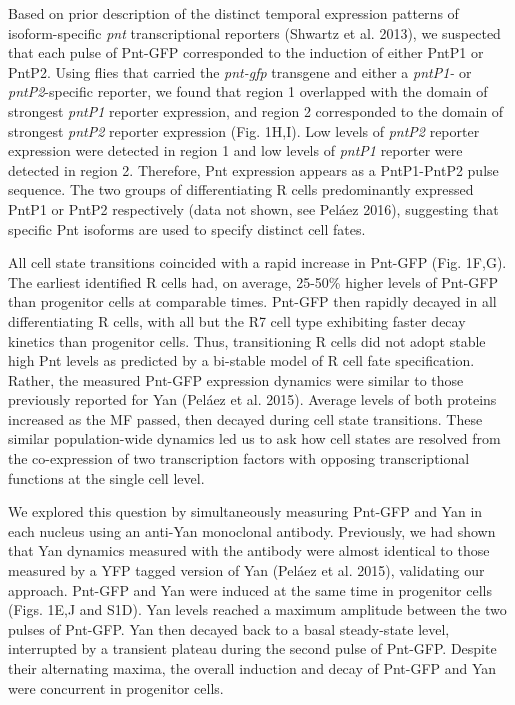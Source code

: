 Based on prior description of the distinct temporal expression patterns of isoform-specific \emph{pnt} transcriptional reporters (Shwartz et al. 2013), we suspected that each pulse of Pnt-GFP corresponded to the induction of either PntP1 or PntP2. Using flies that carried the \emph{pnt-gfp} transgene and either a \emph{pntP1-} or \emph{pntP2}-specific reporter, we found that region 1 overlapped with the domain of strongest \emph{pntP1} reporter expression, and region 2 corresponded to the domain of strongest \emph{pntP2} reporter expression (Fig. 1H,I). Low levels of \emph{pntP2} reporter expression were detected in region 1 and low levels of \emph{pntP1} reporter were detected in region 2. Therefore, Pnt expression appears as a PntP1-PntP2 pulse sequence. The two groups of differentiating R cells predominantly expressed PntP1 or PntP2 respectively (data not shown, see Peláez 2016), suggesting that specific Pnt isoforms are used to specify distinct cell fates.

All cell state transitions coincided with a rapid increase in Pnt-GFP (Fig. 1F,G). The earliest identified R cells had, on average, 25-50\% higher levels of Pnt-GFP than progenitor cells at comparable times. Pnt-GFP then rapidly decayed in all differentiating R cells, with all but the R7 cell type exhibiting faster decay kinetics than progenitor cells. Thus, transitioning R cells did not adopt stable high Pnt levels as predicted by a bi-stable model of R cell fate specification. Rather, the measured Pnt-GFP expression dynamics were similar to those previously reported for Yan (Peláez et al. 2015). Average levels of both proteins increased as the MF passed, then decayed during cell state transitions. These similar population-wide dynamics led us to ask how cell states are resolved from the co-expression of two transcription factors with opposing transcriptional functions at the single cell level.

We explored this question by simultaneously measuring Pnt-GFP and Yan in each nucleus using an anti-Yan monoclonal antibody. Previously, we had shown that Yan dynamics measured with the antibody were almost identical to those measured by a YFP tagged version of Yan (Peláez et al. 2015), validating our approach. Pnt-GFP and Yan were induced at the same time in progenitor cells (Figs. 1E,J and S1D). Yan levels reached a maximum amplitude between the two pulses of Pnt-GFP. Yan then decayed back to a basal steady-state level, interrupted by a transient plateau during the second pulse of Pnt-GFP. Despite their alternating maxima, the overall induction and decay of Pnt-GFP and Yan were concurrent in progenitor cells.

